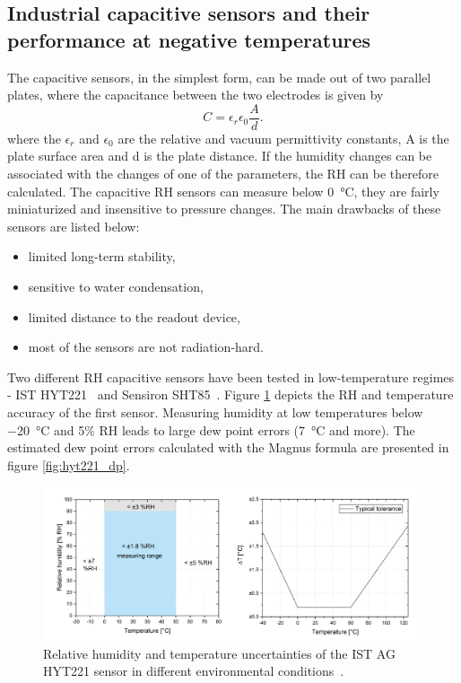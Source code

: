 \subsection{Industrial capacitive sensors and their performance at negative temperatures}
\label{capacitive_sensors}
The capacitive sensors, in the simplest form, can be made out of two parallel plates, where the capacitance between the two electrodes is given by
\begin{equation}
C = \epsilon_{r}\epsilon_0\frac{A}{d}.
\end{equation}
where the $\epsilon_{r}$ and $\epsilon_{0}$ are the relative and vacuum permittivity constants, A is the plate surface area and d is the plate distance. If the humidity changes can be associated with the changes of one of the parameters, the \gls{RH} can be therefore calculated. 
The capacitive \gls{RH} sensors can measure below \SI{0}{\celsius}, they are fairly miniaturized and insensitive to pressure changes. The main drawbacks of these sensors are listed below:
\begin{itemize}
    \item limited long-term stability,
    \item sensitive to water condensation,
    \item limited distance to the readout device,
    \item most of the sensors are not radiation-hard.
\end{itemize}
Two different \gls{RH} capacitive sensors have been tested in low-temperature regimes - IST HYT221~\cite{hyt221} and Sensiron SHT85~\cite{SHT85}. Figure \ref{fig:hyt221} depicts the \gls{RH} and temperature accuracy of the first sensor. Measuring humidity at low temperatures below \SI{-20}{\celsius} and 5\% \gls{RH} leads to large dew point errors (\SI{7}{\celsius} and more). The estimated dew point errors calculated with the Magnus formula are presented in figure \ref{fig:hyt221_dp}.
\begin{figure}[!h]
\centering
\includegraphics[width=0.9\columnwidth]{Chapter5/images/hyt221_rh.png}
\caption{Relative humidity and temperature uncertainties of the IST AG HYT221 sensor in different environmental conditions~\cite{hyt221}.}
\label{fig:hyt221}
\end{figure}
